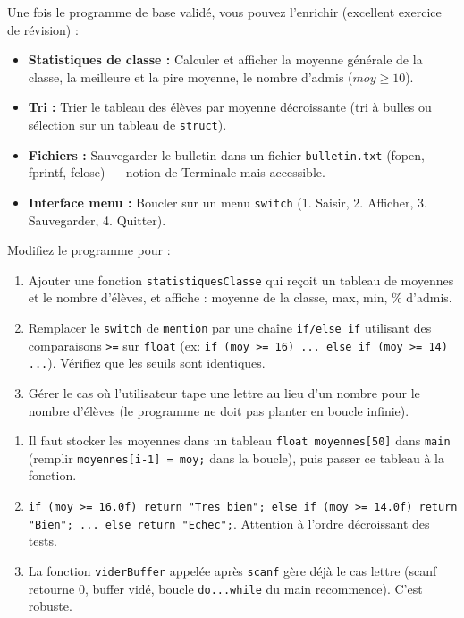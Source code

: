 \documentclass[11pt]{article}
\begin{document}
Une fois le programme de base validé, vous pouvez l'enrichir (excellent exercice de révision) :
\begin{itemize}
    \item \textbf{Statistiques de classe :} Calculer et afficher la moyenne générale de la classe, la meilleure et la pire moyenne, le nombre d'admis ($moy \ge 10$).
    \item \textbf{Tri :} Trier le tableau des élèves par moyenne décroissante (tri à bulles ou sélection sur un tableau de \texttt{struct}).
    \item \textbf{Fichiers :} Sauvegarder le bulletin dans un fichier \texttt{bulletin.txt} (fopen, fprintf, fclose) — notion de Terminale mais accessible.
    \item \textbf{Interface menu :} Boucler sur un menu \texttt{switch} (1. Saisir, 2. Afficher, 3. Sauvegarder, 4. Quitter).
\end{itemize}

\begin{exercice}
Modifiez le programme pour :
\begin{enumerate}
    \item Ajouter une fonction \texttt{statistiquesClasse} qui reçoit un tableau de moyennes et le nombre d'élèves, et affiche : moyenne de la classe, max, min, \% d'admis.
    \item Remplacer le \texttt{switch} de \texttt{mention} par une chaîne \texttt{if/else if} utilisant des comparaisons \texttt{>=} sur \texttt{float} (ex: \texttt{if (moy >= 16) ... else if (moy >= 14) ...}). Vérifiez que les seuils sont identiques.
    \item Gérer le cas où l'utilisateur tape une lettre au lieu d'un nombre pour le nombre d'élèves (le programme ne doit pas planter en boucle infinie).
\end{enumerate}
\end{exercice}

\begin{corrige}
\begin{enumerate}
    \item Il faut stocker les moyennes dans un tableau \texttt{float moyennes[50]} dans \texttt{main} (remplir \texttt{moyennes[i-1] = moy;} dans la boucle), puis passer ce tableau à la fonction.
    \item \texttt{if (moy >= 16.0f) return "Tres bien"; else if (moy >= 14.0f) return "Bien"; ... else return "Echec";}. Attention à l'ordre décroissant des tests.
    \item La fonction \texttt{viderBuffer} appelée après \texttt{scanf} gère déjà le cas lettre (scanf retourne 0, buffer vidé, boucle \texttt{do...while} du main recommence). C'est robuste.
\end{enumerate}
\end{corrige}
\end{document}
